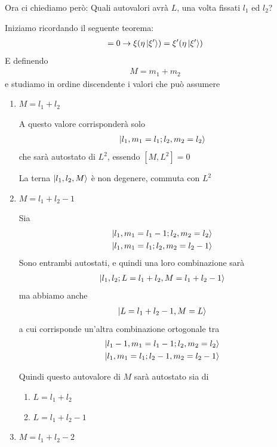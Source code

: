 Ora ci chiediamo però: Quali autovalori avrà $L$, una volta fissati $l_1$ ed $l_2$? 

Iniziamo ricordando il seguente teorema:
\begin{align}
[\xi, \eta]=0 \rightarrow \xi(\eta\ket{\xi'})=\xi'(\eta\ket{\xi'})
\end{align}
E definendo
\begin{align}
M= m_1 + m_2
\end{align}
e studiamo in ordine discendente i valori che può assumere

\begin{enumerate}
	\item $M= l_1 + l_2$
	
	A questo valore corrisponderà solo 
	\begin{align}
	\ket{l_1,m_1=l_1; l_2,m_2=l_2}
	\end{align}
	che sarà autostato di $L^2$, essendo $[M,L^2]=0$
	
	La terna $\ket{l_1,l_2,M}$ è non degenere, commuta con $L^2$
	
	\item $M=l_1 + l_2-1$
	
	Sia 
	\begin{align}
	\ket{l_1,m_1= l_1 -1; l_2,m_2= l_2} \\
	\ket{l_1,m_1=l_1; l_2,m_2=l_2-1}
	\end{align}
	Sono entrambi autostati, e quindi una loro combinazione sarà
	\begin{align}
	\ket{l_1,l_2;L=l_1+l_2,M=l_1+l_2-1}
	\end{align}
	ma abbiamo anche
	\begin{align}
	\ket{L= l_1 + l_2 -1, M=L}
	\end{align}
	a cui corrisponde un'altra combinazione ortogonale tra
	\begin{align}
	\ket{l_1-1,m_1= l_1 -1; l_2,m_2= l_2} \\
	\ket{l_1,m_1=l_1; l_2-1,m_2=l_2-1}
	\end{align}

	Quindi questo autovalore di $M$ sarà autostato sia di 
	\begin{enumerate}
		\item $L=l_1 + l_2$ 
		\item $L=l_1 + l_2-1$
		
	\end{enumerate}
	\item $M=l_1 + l_2 - 2$
	

\end{enumerate}
